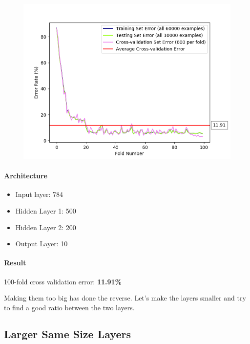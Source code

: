 \documentclass[11pt]{article}
\makeatletter
\def\maxwidth{\ifdim\Gin@nat@width>\linewidth\linewidth
    \else\Gin@nat@width\fi}
\let\Oldincludegraphics\includegraphics
\renewcommand{\includegraphics}[1]{\Oldincludegraphics[width=.8\maxwidth]{#1}}
\providecommand{\tightlist}{%
      \setlength{\itemsep}{0pt}\setlength{\parskip}{0pt}}
\makeatother
\begin{document}
\begin{figure}[htbp]
\centering
\includegraphics{plots/ff-layersize-500-200.png}
\end{figure}

\paragraph{Architecture}\label{architecture-3}

\begin{itemize}
\tightlist
\item
  Input layer: 784
\item
  Hidden Layer 1: 500
\item
  Hidden Layer 2: 200
\item
  Output Layer: 10
\end{itemize}

\paragraph{Result}\label{result-3}

100-fold cross validation error: \textbf{11.91\%}

Making them too big has done the reverse. Let's make the layers smaller
and try to find a good ratio between the two layers.

\pagebreak

\subsection{Larger Same Size Layers}\label{larger-same-size-layers}
\end{document}
